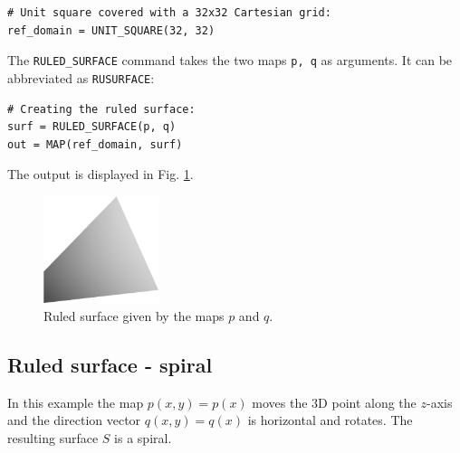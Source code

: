 \begin{bbox}
\begin{verbatim}
# Unit square covered with a 32x32 Cartesian grid:  
ref_domain = UNIT_SQUARE(32, 32)
\end{verbatim}
\end{bbox}
\vspace{6mm}

\noindent
The {\tt RULED\_SURFACE} command takes the two maps {\tt p, q}
as arguments. It can be abbreviated as {\tt RUSURFACE}: \\

\begin{bbox}
\begin{verbatim}
# Creating the ruled surface:
surf = RULED_SURFACE(p, q)
out = MAP(ref_domain, surf)
\end{verbatim}
\end{bbox}
\vspace{6mm}

\noindent
The output is displayed in Fig. \ref{fig:curves-6}.

\begin{figure}[!ht]
\begin{center}
\includegraphics[width=0.3\textwidth]{img/curves-6.png}
\end{center}
\vspace{-4mm}
\caption{Ruled surface given by the maps $p$ and $q$.}
\label{fig:curves-6}
\end{figure}

\subsection{Ruled surface - spiral}

In this example the map $p(x, y) = p(x)$ moves the 3D point 
along the $z$-axis and the direction vector $q(x, y) = q(x)$ 
is horizontal and rotates. The resulting surface $S$ is a spiral.\\

